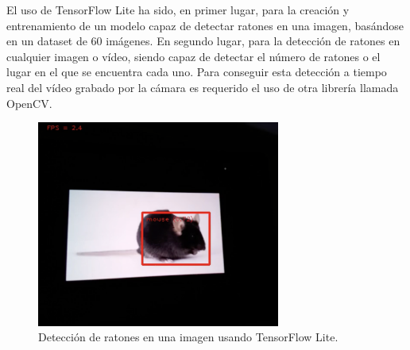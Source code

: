 El uso de TensorFlow Lite ha sido, en primer lugar, para la creación y entrenamiento de un modelo capaz de detectar ratones en una imagen, basándose en un dataset de 60 imágenes. En segundo lugar, para la detección de ratones en cualquier imagen o vídeo, siendo capaz de detectar el número de ratones o el lugar en el que se encuentra cada uno. Para conseguir esta detección a tiempo real del vídeo grabado por la cámara es requerido el uso de otra librería llamada OpenCV.\\
\begin{figure} [h!]
  \begin{center}
    \includegraphics[width=8cm]{figs/raton-detectado}
  \end{center}
  \caption{Detección de ratones en una imagen usando TensorFlow Lite.}
  \label{fig:tesla}
\end{figure}\\

